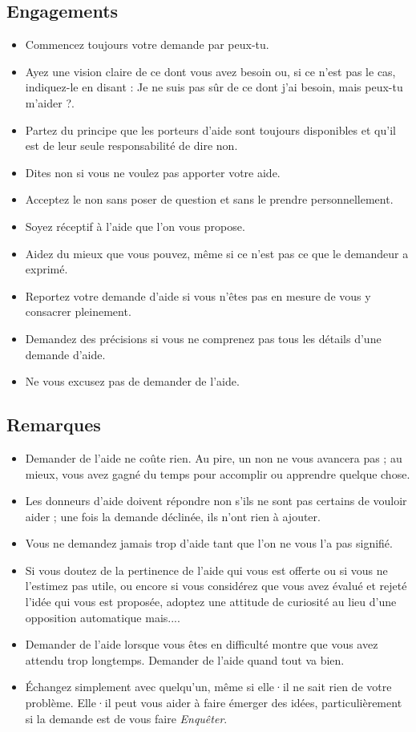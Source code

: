 \documentclass{book}
\begin{document}
\subsection{Engagements}
\begin{itemize}
	\item Commencez toujours votre demande par \og{}peux-tu\fg{}.
	\item Ayez une vision claire de ce dont vous avez besoin ou, si ce n'est pas le cas, indiquez-le en disant : \og{}Je ne suis pas sûr 
	      de ce dont j'ai besoin, mais peux-tu m'aider ?\fg{}.
    \item Partez du principe que les porteurs d'aide sont toujours disponibles et qu'il est de leur seule responsabilité de dire \og{}non\fg{}.
    \item Dites \og{}non\fg{} si vous ne voulez pas apporter votre aide.
    \item Acceptez le \og{}non\fg{} sans poser de question et sans le prendre personnellement.
    \item Soyez réceptif à l'aide que l'on vous propose.
    \item Aidez du mieux que vous pouvez, même si ce n'est pas ce que le demandeur a exprimé.
    \item Reportez votre demande d'aide si vous n'êtes pas en mesure de vous y consacrer pleinement.
    \item Demandez des précisions si vous ne comprenez pas tous les détails d'une demande d'aide.
    \item Ne vous excusez pas de demander de l'aide.
\end{itemize}

\subsection{Remarques}
\begin{itemize}
	\item Demander de l'aide ne coûte rien. Au pire, un \og{}non\fg{} ne vous avancera pas ; au mieux, vous avez gagné du temps pour
	      accomplir ou apprendre quelque chose.
	\item Les donneurs d'aide doivent répondre \og{}non\fg{} s'ils ne sont pas certains de vouloir aider ; une fois la demande déclinée,
	      ils n'ont rien à ajouter.
	\item Vous ne demandez jamais \og{}trop\fg{} d'aide tant que l'on ne vous l'a pas signifié.
	\item Si vous doutez de la pertinence de l'aide qui vous est offerte ou si vous ne l'estimez pas utile, ou encore si vous considérez 
	      que vous avez évalué et rejeté l'idée qui vous est proposée, adoptez une attitude de curiosité au lieu d'une opposition automatique
	      \og{}mais...\fg{}.
	\item Demander de l'aide lorsque vous êtes en difficulté montre que vous avez attendu trop longtemps. Demander de l'aide quand tout va bien.
	\item Échangez simplement avec quelqu'un, même si elle·il ne sait rien de votre problème. Elle·il peut vous aider à faire émerger des idées,
	      particulièrement si la demande est de vous faire \emph{Enquêter}.
\end{itemize}
\end{document}
